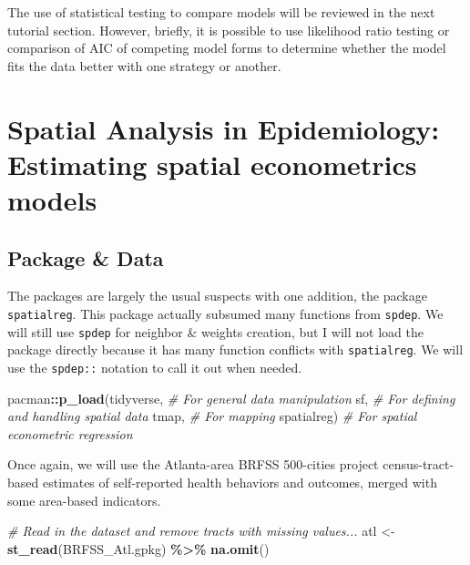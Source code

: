 \documentclass[
]{book}
\newenvironment{Shaded}{\begin{snugshade}}{\end{snugshade}}
\newcommand{\CommentTok}[1]{\textcolor[rgb]{0.56,0.35,0.01}{\textit{#1}}}
\newcommand{\FunctionTok}[1]{\textcolor[rgb]{0.13,0.29,0.53}{\textbf{#1}}}
\newcommand{\NormalTok}[1]{#1}
\newcommand{\OtherTok}[1]{\textcolor[rgb]{0.56,0.35,0.01}{#1}}
\newcommand{\SpecialCharTok}[1]{\textcolor[rgb]{0.81,0.36,0.00}{\textbf{#1}}}
\newcommand{\StringTok}[1]{\textcolor[rgb]{0.31,0.60,0.02}{#1}}
\begin{document}
The use of statistical testing to compare models will be reviewed in the next tutorial section. However, briefly, it is possible to use likelihood ratio testing or comparison of AIC of competing model forms to determine whether the model fits the data better with one strategy or another.

\hypertarget{spatial-analysis-in-epidemiology-estimating-spatial-econometrics-models}{%
\section{Spatial Analysis in Epidemiology: Estimating spatial econometrics models}\label{spatial-analysis-in-epidemiology-estimating-spatial-econometrics-models}}

\hypertarget{package-data}{%
\subsection{Package \& Data}\label{package-data}}

The packages are largely the usual suspects with one addition, the package \texttt{spatialreg}. This package actually subsumed many functions from \texttt{spdep}. We will still use \texttt{spdep} for neighbor \& weights creation, but I will not load the package directly because it has many function conflicts with \texttt{spatialreg}. We will use the \texttt{spdep::} notation to call it out when needed.

\begin{Shaded}
\begin{Highlighting}[]
\NormalTok{pacman}\SpecialCharTok{::}\FunctionTok{p\_load}\NormalTok{(tidyverse,   }\CommentTok{\# For general data manipulation}
\NormalTok{               sf,          }\CommentTok{\# For defining and handling spatial data}
\NormalTok{               tmap,        }\CommentTok{\# For mapping}
\NormalTok{               spatialreg)  }\CommentTok{\# For spatial econometric regression}
\end{Highlighting}
\end{Shaded}

Once again, we will use the Atlanta-area BRFSS 500-cities project census-tract-based estimates of self-reported health behaviors and outcomes, merged with some area-based indicators.

\begin{Shaded}
\begin{Highlighting}[]
\CommentTok{\# Read in the dataset and remove tracts with missing values...}
\NormalTok{atl }\OtherTok{\textless{}{-}} \FunctionTok{st\_read}\NormalTok{(}\StringTok{\textquotesingle{}BRFSS\_Atl.gpkg\textquotesingle{}}\NormalTok{) }\SpecialCharTok{\%\textgreater{}\%}
  \FunctionTok{na.omit}\NormalTok{() }
\end{Highlighting}
\end{Shaded}
\end{document}
